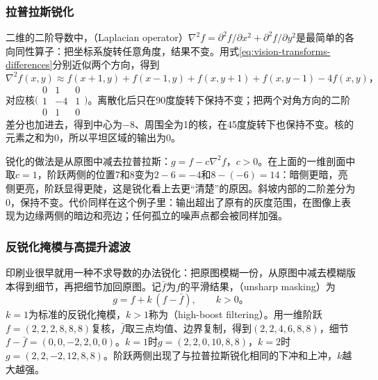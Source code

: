 \subsubsection{拉普拉斯锐化}

二维的二阶导数中，（Laplacian operator）$\nabla^2f=\partial^2f/\partial x^2+\partial^2f/\partial y^2$是最简单的各向同性算子：把坐标系旋转任意角度，结果不变。用式\eqref{eq:vision-transforms-differences}分别近似两个方向，得到
\begin{equation}
  \nabla^2f(x,y)\approx f(x+1,y)+f(x-1,y)+f(x,y+1)+f(x,y-1)-4f(x,y)\text{，}
  \label{eq:vision-transforms-laplacian}
\end{equation}
对应核$\bigl(\begin{smallmatrix}0&1&0\\1&-4&1\\0&1&0\end{smallmatrix}\bigr)$。离散化后只在90度旋转下保持不变；把两个对角方向的二阶差分也加进去，得到中心为$-8$、周围全为1的核，在45度旋转下也保持不变。核的元素之和为0，所以平坦区域的输出为0。

锐化的做法是从原图中减去拉普拉斯：$g=f-c\nabla^2f$，$c>0$。在上面的一维剖面中取$c=1$，阶跃两侧的位置7和8变为$2-6=-4$和$8-(-6)=14$：暗侧更暗，亮侧更亮，阶跃显得更陡，这是锐化看上去更“清楚”的原因。斜坡内部的二阶差分为0，保持不变。代价同样在这个例子里：输出超出了原有的灰度范围，在图像上表现为边缘两侧的暗边和亮边；任何孤立的噪声点都会被同样加强。

\subsubsection{反锐化掩模与高提升滤波}

印刷业很早就用一种不求导数的办法锐化：把原图模糊一份，从原图中减去模糊版本得到细节，再把细节加回原图。记$\bar f$为$f$的平滑结果，（unsharp masking）为
\begin{equation}
  g=f+k\,(f-\bar f),\qquad k>0\text{。}
  \label{eq:vision-transforms-unsharp}
\end{equation}
$k=1$为标准的反锐化掩模，$k>1$称为（high-boost filtering）。用一维阶跃$f=(2,2,2,8,8,8)$复核，$\bar f$取三点均值、边界复制，得到$(2,2,4,6,8,8)$，细节$f-\bar f=(0,0,-2,2,0,0)$。$k=1$时$g=(2,2,0,10,8,8)$，$k=2$时$g=(2,2,-2,12,8,8)$。阶跃两侧出现了与拉普拉斯锐化相同的下冲和上冲，$k$越大越强。

